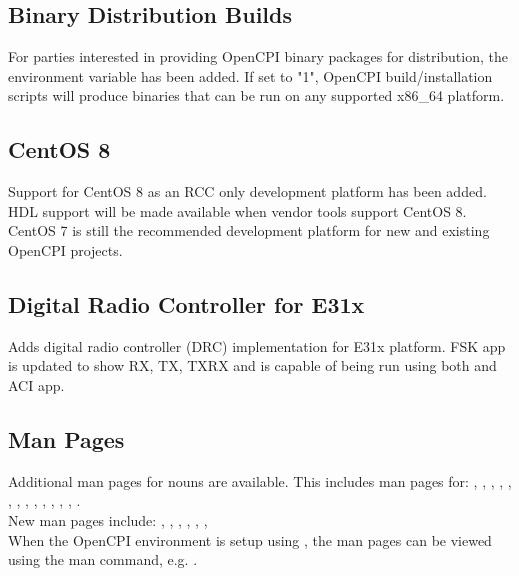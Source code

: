 \subsection{Binary Distribution Builds}
\label{sec:20_binary_distribution}
For parties interested in providing OpenCPI binary packages for distribution, the  environment variable has been added.  If set to "1", OpenCPI build/installation scripts will produce binaries that can be run on any supported x86\_{}64 platform.

\subsection{CentOS 8}
\label{sec:20_centos8}
Support for CentOS 8 as an RCC only development platform has been added. HDL support will be made available when vendor tools support CentOS 8. CentOS 7 is still the recommended development platform for new and existing OpenCPI projects.

\subsection{Digital Radio Controller for E31x}
\label{sec:20_digital_radio}
Adds digital radio controller (DRC) implementation for E31x platform. FSK app  is updated to show RX, TX, TXRX and is capable of being run using both  and ACI app.

\subsection{Man Pages}
\label{sec:20_man_pages}
Additional man pages for  nouns are available. This includes man pages for: , , , , , , , , , , , , , .\\

New man pages include: , , , , , , \\

When the OpenCPI environment is setup using , the man pages can be viewed using the man command, e.g. .\\

